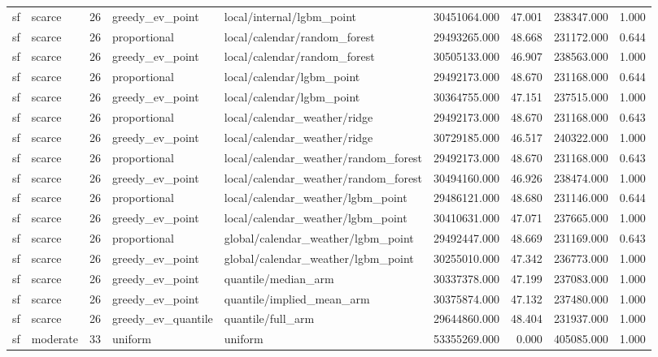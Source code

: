 \begin{tabular}{llrllrrrr}
sf & scarce & 26 & greedy\_ev\_point & local/internal/lgbm\_point & 30451064.000 & 47.001 & 238347.000 & 1.000 \\
sf & scarce & 26 & proportional & local/calendar/random\_forest & 29493265.000 & 48.668 & 231172.000 & 0.644 \\
sf & scarce & 26 & greedy\_ev\_point & local/calendar/random\_forest & 30505133.000 & 46.907 & 238563.000 & 1.000 \\
sf & scarce & 26 & proportional & local/calendar/lgbm\_point & 29492173.000 & 48.670 & 231168.000 & 0.644 \\
sf & scarce & 26 & greedy\_ev\_point & local/calendar/lgbm\_point & 30364755.000 & 47.151 & 237515.000 & 1.000 \\
sf & scarce & 26 & proportional & local/calendar\_weather/ridge & 29492173.000 & 48.670 & 231168.000 & 0.643 \\
sf & scarce & 26 & greedy\_ev\_point & local/calendar\_weather/ridge & 30729185.000 & 46.517 & 240322.000 & 1.000 \\
sf & scarce & 26 & proportional & local/calendar\_weather/random\_forest & 29492173.000 & 48.670 & 231168.000 & 0.643 \\
sf & scarce & 26 & greedy\_ev\_point & local/calendar\_weather/random\_forest & 30494160.000 & 46.926 & 238474.000 & 1.000 \\
sf & scarce & 26 & proportional & local/calendar\_weather/lgbm\_point & 29486121.000 & 48.680 & 231146.000 & 0.644 \\
sf & scarce & 26 & greedy\_ev\_point & local/calendar\_weather/lgbm\_point & 30410631.000 & 47.071 & 237665.000 & 1.000 \\
sf & scarce & 26 & proportional & global/calendar\_weather/lgbm\_point & 29492447.000 & 48.669 & 231169.000 & 0.643 \\
sf & scarce & 26 & greedy\_ev\_point & global/calendar\_weather/lgbm\_point & 30255010.000 & 47.342 & 236773.000 & 1.000 \\
sf & scarce & 26 & greedy\_ev\_point & quantile/median\_arm & 30337378.000 & 47.199 & 237083.000 & 1.000 \\
sf & scarce & 26 & greedy\_ev\_point & quantile/implied\_mean\_arm & 30375874.000 & 47.132 & 237480.000 & 1.000 \\
sf & scarce & 26 & greedy\_ev\_quantile & quantile/full\_arm & 29644860.000 & 48.404 & 231937.000 & 1.000 \\
sf & moderate & 33 & uniform & uniform & 53355269.000 & 0.000 & 405085.000 & 1.000 \\

\end{tabular}
